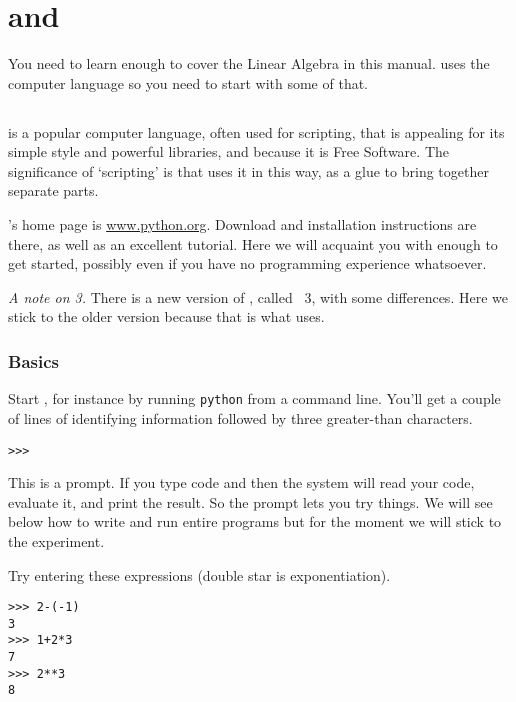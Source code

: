 \chapter{\python{} and \sage{}}

You need to learn enough \sage{} to cover the Linear Algebra
in this manual.
\sage{} uses the computer language \python{} so you need to start with 
some of that.




\section{\python}
\python{} is a popular computer language, often used for scripting,
that is appealing for its simple style and powerful libraries,
and because it is Free Software.
The significance of `scripting' is that \sage{} uses it in this way,
as a glue to bring together separate parts.

\python's home page is \href{http://www.python.org}{\url{www.python.org}}.
Download and installation instructions are there, as well as 
an excellent tutorial.
Here we will acquaint you with enough \python{} to get started, possibly
even if you have no programming experience whatsoever.

\smallskip
\textit{A note on \python{} 3.}
There is a new version of \python{}, called \python~3, with some differences.
Here we stick to the older version 
because that is what \sage{} uses.


\subsection{Basics}
Start \python, for instance by running 
\lstinline[style=inline]!python!
from a command line.
You'll get a couple of lines of 
identifying information followed by three greater-than
characters.
\begin{lstlisting}[style=python]
>>>   
\end{lstlisting}
This is a prompt.
If you type \python{} code and  then the system
will read your code, evaluate it, and print the result.
So the prompt lets you try things.
We will see below how to write and run entire \python{} programs
but for the moment we will stick to the experiment. 

Try entering these expressions (double star is exponentiation).
\begin{lstlisting}[style=python]
>>> 2-(-1)
3
>>> 1+2*3
7
>>> 2**3
8  
\end{lstlisting}

